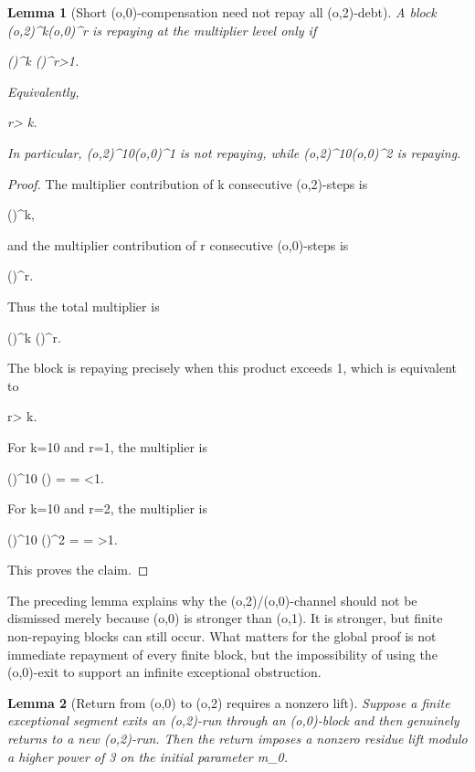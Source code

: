 \documentclass[11pt,letterpaper]{amsart}
\def\({}%
\def\){}%
\def\[{ }%
\def\]{ }%
\theoremstyle{definition}
\theoremstyle{plain}
\newtheorem{lemma}{Lemma}
\theoremstyle{plain}
\theoremstyle{remark}
\begin{document}
\begin{lemma}[Short \((o,0)\)-compensation need not repay all
\((o,2)\)-debt]
\label{lem:short-o0-compensation}
A block \((o,2)^k(o,0)^r\) is repaying at the multiplier level only if
\[
\left(\right)^k
\left(\right)^r>1.
\]
Equivalently,
\[
r>
k.
\]
In particular, \((o,2)^{10}(o,0)^1\) is not repaying, while
\((o,2)^{10}(o,0)^2\) is repaying.
\end{lemma}

\begin{proof}
The multiplier contribution of \(k\) consecutive \((o,2)\)-steps is
\[
\left(\right)^k,
\]
and the multiplier contribution of \(r\) consecutive \((o,0)\)-steps is
\[
\left(\right)^r.
\]
Thus the total multiplier is
\[
\left(\right)^k
\left(\right)^r.
\]
The block is repaying precisely when this product exceeds \(1\), which is
equivalent to
\[
r>
k.
\]
For \(k=10\) and \(r=1\), the multiplier is
\[
\left(\right)^{10}
\left(\right)
=
=
<1.
\]
For \(k=10\) and \(r=2\), the multiplier is
\[
\left(\right)^{10}
\left(\right)^2
=
=
>1.
\]
This proves the claim.
\end{proof}

The preceding lemma explains why the \((o,2)/(o,0)\)-channel should not
be dismissed merely because \((o,0)\) is stronger than \((o,1)\).  It is
stronger, but finite non-repaying blocks can still occur.  What matters
for the global proof is not immediate repayment of every finite block,
but the impossibility of using the \((o,0)\)-exit to support an infinite
exceptional obstruction.

\begin{lemma}[Return from \((o,0)\) to \((o,2)\) requires a nonzero lift]
\label{lem:o0-return-to-o2-nonzero-lift}
Suppose a finite exceptional segment exits an \((o,2)\)-run through an
\((o,0)\)-block and then genuinely returns to a new \((o,2)\)-run.  Then
the return imposes a nonzero residue lift modulo a higher power of \(3\)
on the initial parameter \(m_0\).
\end{lemma}
\end{document}
